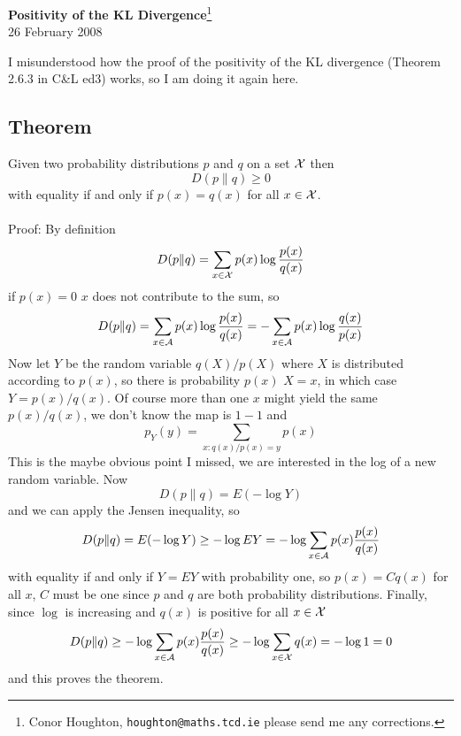 \documentclass[12pt]{article}
\begin{document}
\begin{center}{\Large
{\bf Positivity of the KL Divergence}\footnote{Conor Houghton, {\tt houghton@maths.tcd.ie} please
send me any corrections.}}\\[1cm] 26 February 2008\\[1cm]
\end{center}

I misunderstood how the proof of the positivity of the KL divergence (Theorem 2.6.3 in C\&L ed3) works, so I am doing it again here.

\subsection*{Theorem} Given two probability distributions $p$ and $q$ on a set ${\cal X}$ then 
\begin{equation}
D(p\|q)\ge 0
\end{equation}
with equality if and only if $p(x)=q(x)$ for all $x\in{\cal X}$.
\\
\\Proof: By definition
\begin{equation}
D(p\|q)=\sum_{x\in {\cal X}} p(x)\log{\frac{p(x)}{q(x)}}
\end{equation}
if $p(x)=0$ $x$ does not contribute to the sum, so
\begin{equation}
D(p\|q)=\sum_{x\in {\cal A}} p(x)\log{\frac{p(x)}{q(x)}}
       =-\sum_{x\in {\cal A}} p(x)\log{\frac{q(x)}{p(x)}}
\end{equation}
Now let $Y$ be the random variable $q(X)/p(X)$ where $X$ is distributed according to $p(x)$, so there is probability $p(x)$ $X=x$, in which case $Y=p(x)/q(x)$. Of course more than one $x$ might yield the same $p(x)/q(x)$, we don't know the map is $1-1$ and 
\begin{equation}
p_Y(y)=\sum_{x:q(x)/p(x)=y}p(x)
\end{equation}
This is the maybe obvious point I missed, we are interested in the log
of a new random variable. Now
\begin{equation}
D(p\|q)=E(-\log{Y})
\end{equation}
and we can apply the Jensen inequality, so
\begin{equation}
D(p\|q)=E(-\log{Y})\ge -\log{EY}=-\log{\sum_{x\in {\cal A}}p(x)\frac{p(x)}{q(x)}}
\end{equation}
with equality if and only if $Y=EY$ with probability one, so
$p(x)=Cq(x)$ for all $x$, $C$ must be one since $p$ and $q$ are both
probability distributions. Finally, since $\log$ is increasing and $q(x)$ is positive for all $x\in{\cal X}$
\begin{equation}
D(p\|q)\ge -\log{\sum_{x\in {\cal A}}p(x)\frac{p(x)}{q(x)}}\ge
-\log{\sum_{x\in {\cal X}}q(x)}=-\log{1}=0
\end{equation}
and this proves the theorem.
\end{document}
